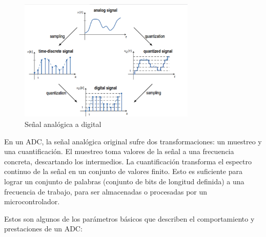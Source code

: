 \documentclass[12pt]{report} %
\begin{document}
	\begin{figure}[H]
		\includegraphics[width=0.75\textwidth]{analog-vs-digital-signal.jpg}
		\caption[Señal analógica a digital]{Señal analógica a digital\protect\footnotemark}
		\label{fig:analog-vs-digital-signal.jpg}
	\end{figure}

	En un ADC, la señal analógica original sufre dos transformaciones: un muestreo y una cuantificación. El muestreo toma valores de la señal a una frecuencia concreta, descartando los intermedios. La cuantificación transforma el espectro continuo de la señal en un conjunto de valores finito. Esto es suficiente para lograr un conjunto de palabras (conjunto de bits de longitud definida) a una frecuencia de trabajo, para ser almacenadas o procesadas por un microcontrolador.
	
	Estos son algunos de los parámetros básicos que describen el comportamiento y prestaciones de un ADC:
	
\end{document}
